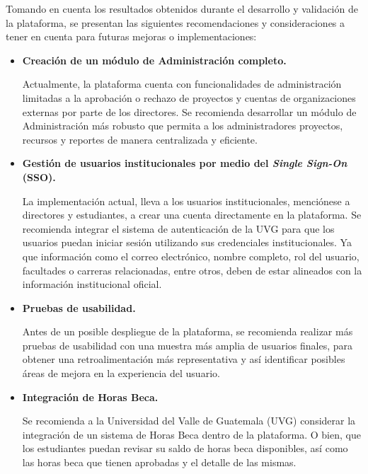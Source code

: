 Tomando en cuenta los resultados obtenidos durante el desarrollo y validación de la plataforma, se presentan las siguientes recomendaciones y 
consideraciones a tener en cuenta para futuras mejoras o implementaciones:

\begin{itemize}
	\item \textbf{Creación de un módulo de Administración completo.}
		
			Actualmente, la plataforma cuenta con funcionalidades de administración limitadas a la aprobación o rechazo de proyectos
			y cuentas de organizaciones externas por parte de los directores.
			Se recomienda desarrollar un módulo de Administración más robusto que permita a los administradores proyectos, recursos
			y reportes de manera centralizada y eficiente.
	\item \textbf{Gestión de usuarios institucionales por medio del \textit{Single Sign-On} (SSO).}
			
			La implementación actual, lleva a los usuarios institucionales, menciónese a directores y estudiantes, a crear una
			cuenta directamente en la plataforma. 
			Se recomienda integrar el sistema de autenticación de la UVG para que los usuarios puedan iniciar sesión utilizando
			sus credenciales institucionales. Ya que información como el correo electrónico, nombre completo, rol del usuario,
			facultades o carreras relacionadas, entre otros, deben de estar alineados con la información institucional oficial.
	\item \textbf{Pruebas de usabilidad.}
			
			Antes de un posible despliegue de la plataforma, se recomienda realizar más pruebas de usabilidad con una muestra más
			amplia de usuarios finales, para obtener una retroalimentación más representativa y así identificar posibles áreas
			de mejora en la experiencia del usuario.
	\item \textbf{Integración de Horas Beca.}
			
			Se recomienda a la Universidad del Valle de Guatemala (UVG) considerar la integración de un sistema de Horas Beca
			dentro de la plataforma. O bien, que los estudiantes puedan revisar su saldo de horas beca disponibles, así como
			las horas beca que tienen aprobadas y el detalle de las mismas.
\end{itemize}